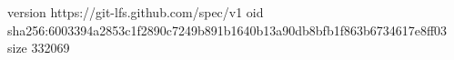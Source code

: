 version https://git-lfs.github.com/spec/v1
oid sha256:6003394a2853c1f2890c7249b891b1640b13a90db8bfb1f863b6734617e8ff03
size 332069
